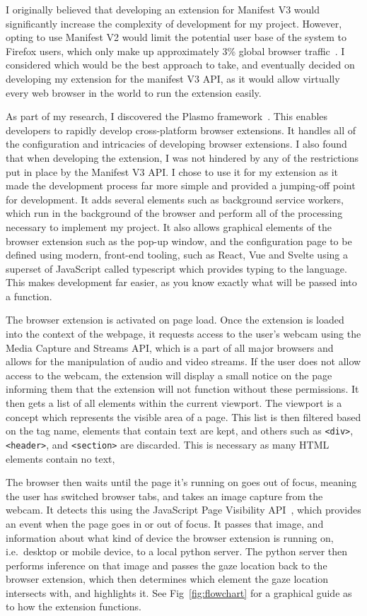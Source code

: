 \documentclass{report}
\begin{document}
I originally believed that developing an extension for Manifest V3 would significantly increase the complexity of development for my project. However, opting to use Manifest V2 would limit the potential user base of the system to Firefox users, which only make up approximately 3\% global browser traffic~\cite{statcounter2024browser}. I considered which would be the best approach to take, and eventually decided on developing my extension for the manifest V3 API, as it would allow virtually every web browser in the world to run the extension easily.

As part of my research, I discovered the Plasmo framework~\cite{plasmo}. This enables developers to rapidly develop cross-platform browser extensions. It handles all of the configuration and intricacies of developing browser extensions. I also found that when developing the extension, I was not hindered by any of the restrictions put in place by the Manifest V3 API. I chose to use it for my extension as it made the development process far more simple and provided a jumping-off point for development. It adds several elements such as background service workers, which run in the background of the browser and perform all of the processing necessary to implement my project. It also allows graphical elements of the browser extension such as the pop-up window, and the configuration page to be defined using modern, front-end tooling, such as React, Vue and Svelte using a superset of JavaScript called typescript which provides typing to the language. This makes development far easier, as you know exactly what will be passed into a function. 

The browser extension is activated on page load. Once the extension is loaded into the context of the webpage, it requests access to the user's webcam using the Media Capture and Streams API, which is a part of all major browsers and allows for the manipulation of audio and video streams. If the user does not allow access to the webcam, the extension will display a small notice on the page informing them that the extension will not function without these permissions. It then gets a list of all elements within the current viewport. The viewport is a concept which represents the visible area of a page. This list is then filtered based on the tag name, elements that contain text are kept, and others such as \texttt{<div>}, \texttt{<header>}, and \texttt{<section>} are discarded. This is necessary as many HTML elements contain no text, 

The browser then waits until the page it's running on goes out of focus, meaning the user has switched browser tabs, and takes an image capture from the webcam. It detects this using the JavaScript Page Visibility API~\cite{pagevisibility}, which provides an event when the page goes in or out of focus. It passes that image, and information about what kind of device the browser extension is running on, i.e.\ desktop or mobile device, to a local python server. The python server then performs inference on that image and passes the gaze location back to the browser extension, which then determines which element the gaze location intersects with, and highlights it. See Fig~\ref{fig:flowchart} for a graphical guide as to how the extension functions. 
\end{document}
